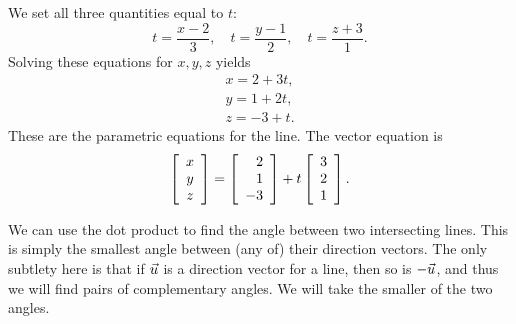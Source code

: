 \documentclass{ximera}
\begin{document}
\begin{solution}
  We set all three quantities equal to $t$:
  \begin{equation*}
    t=\frac{x-2}{3}, \quad
    t=\frac{y-1}{2}, \quad
    t=\frac{z+3}{1}.
  \end{equation*}
  Solving these equations for $x,y,z$ yields
  \begin{equation*}
    \begin{array}{c}
      x = 2 + 3t, \\
      y = 1 + 2t, \\
      z = -3 + t.
    \end{array}
  \end{equation*}
  These are the parametric equations for the line. The vector equation
  is
  \begin{equation*}
    \startmat{c}
      x \\
      y \\
      z
    \stopmat =
    \startmat{r}
      2 \\
      1 \\
      -3
    \stopmat
    +
    t
    \startmat{r}
      3 \\
      2 \\
      1
    \stopmat.
  \end{equation*}
\end{solution}

We can use the dot product to find the angle between two intersecting
lines. This is simply the smallest angle between (any of) their
direction vectors. The only subtlety here is that if $\vect{u}$ is a
direction vector for a line, then so is $-\vect{u}$, and thus we will
find pairs of complementary angles. We will take the smaller of the
two angles.
\begin{center} 
\end{center}
\end{document}
